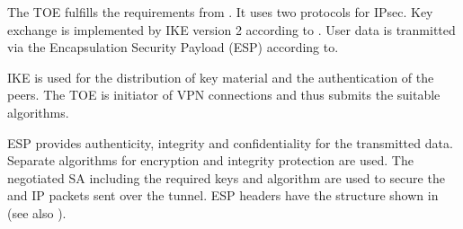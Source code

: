 The TOE fulfills the requirements from . It uses two protocols for
IPsec. Key exchange is implemented by IKE version 2 according to
. User data is tranmitted via the Encapsulation Security Payload
(ESP) according to. 





IKE is used for the distribution of key material and the authentication of the
peers. The TOE is initiator of VPN connections and thus submits the suitable algorithms.



ESP provides authenticity, integrity and confidentiality for the transmitted
data. Separate algorithms for encryption and integrity protection are used. The
negotiated SA including the required keys and algorithm are used to secure the
and IP packets sent over the tunnel. ESP headers have the structure shown in
 (see also
\cite[Figure~2]{rfc4303}).


